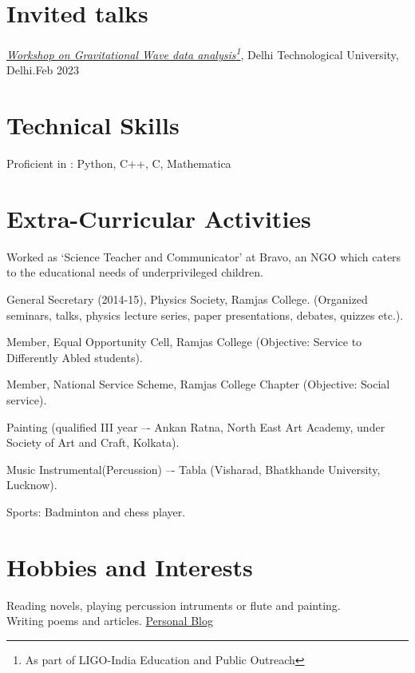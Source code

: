 \documentclass[margin,line]{res}
\begin{document}
\begin{resume}
\section{\sc Invited talks}
\begin{itemize}[noitemsep]
{
\item \href{https://github.com/singhmukesh1729/EPO_DTU2023}{\textit{Workshop on Gravitational Wave data analysis\footnote{As part of LIGO-India Education and Public Outreach}}}, Delhi Technological University, Delhi.\hfill{Feb 2023}
}\end{itemize}

\section{\sc Technical Skills}
Proficient in : Python, C++, C, Mathematica\\

\section{\sc Extra-Curricular Activities}
\begin{itemize}[noitemsep]
{
\item Worked as `Science Teacher and Communicator' at Bravo, an NGO which caters to the educational needs of underprivileged children.
\item General Secretary (2014-15), Physics Society, Ramjas College. (Organized seminars, talks, physics lecture series, paper presentations, debates, quizzes etc.).
\item Member, Equal Opportunity Cell, Ramjas College (Objective: Service to Differently Abled students).
\item Member, National Service Scheme, Ramjas College Chapter (Objective: Social service).
\item Painting (qualified III year –- Ankan Ratna, North East Art Academy, under Society of Art and Craft, Kolkata).
\item Music Instrumental(Percussion) –- Tabla (Visharad, Bhatkhande University, Lucknow).
\item Sports: Badminton and chess player.
}
\end{itemize}

\section{\sc Hobbies and Interests}
Reading novels, playing percussion intruments or flute and painting.\\ Writing poems and articles. \href{http://megh-ud.blogspot.com/}{Personal Blog}

\end{resume}
\end{document}
